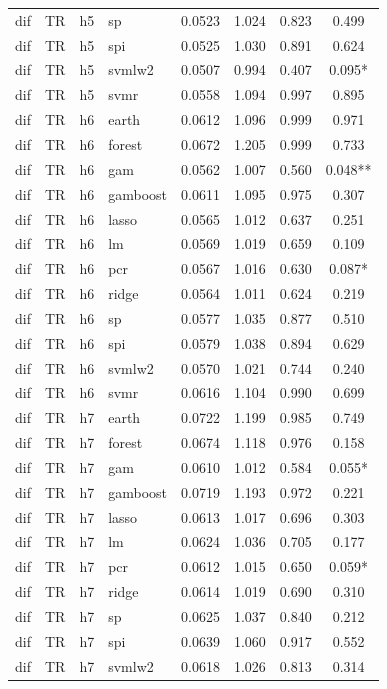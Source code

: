 \begin{ThreePartTable}
\begin{longtable}[t]{llclcccc}
dif & TR & h5 & sp & 0.0523 & 1.024 & 0.823 & 0.499\\
dif & TR & h5 & spi & 0.0525 & 1.030 & 0.891 & 0.624\\
dif & TR & h5 & svmlw2 & 0.0507 & 0.994 & 0.407 & 0.095*\\
dif & TR & h5 & svmr & 0.0558 & 1.094 & 0.997 & 0.895\\
\addlinespace
dif & TR & h6 & earth & 0.0612 & 1.096 & 0.999 & 0.971\\
dif & TR & h6 & forest & 0.0672 & 1.205 & 0.999 & 0.733\\
dif & TR & h6 & gam & 0.0562 & 1.007 & 0.560 & 0.048**\\
dif & TR & h6 & gamboost & 0.0611 & 1.095 & 0.975 & 0.307\\
dif & TR & h6 & lasso & 0.0565 & 1.012 & 0.637 & 0.251\\
dif & TR & h6 & lm & 0.0569 & 1.019 & 0.659 & 0.109\\
dif & TR & h6 & pcr & 0.0567 & 1.016 & 0.630 & 0.087*\\
dif & TR & h6 & ridge & 0.0564 & 1.011 & 0.624 & 0.219\\
dif & TR & h6 & sp & 0.0577 & 1.035 & 0.877 & 0.510\\
dif & TR & h6 & spi & 0.0579 & 1.038 & 0.894 & 0.629\\
dif & TR & h6 & svmlw2 & 0.0570 & 1.021 & 0.744 & 0.240\\
dif & TR & h6 & svmr & 0.0616 & 1.104 & 0.990 & 0.699\\
\addlinespace
dif & TR & h7 & earth & 0.0722 & 1.199 & 0.985 & 0.749\\
dif & TR & h7 & forest & 0.0674 & 1.118 & 0.976 & 0.158\\
dif & TR & h7 & gam & 0.0610 & 1.012 & 0.584 & 0.055*\\
dif & TR & h7 & gamboost & 0.0719 & 1.193 & 0.972 & 0.221\\
dif & TR & h7 & lasso & 0.0613 & 1.017 & 0.696 & 0.303\\
dif & TR & h7 & lm & 0.0624 & 1.036 & 0.705 & 0.177\\
dif & TR & h7 & pcr & 0.0612 & 1.015 & 0.650 & 0.059*\\
dif & TR & h7 & ridge & 0.0614 & 1.019 & 0.690 & 0.310\\
dif & TR & h7 & sp & 0.0625 & 1.037 & 0.840 & 0.212\\
dif & TR & h7 & spi & 0.0639 & 1.060 & 0.917 & 0.552\\
dif & TR & h7 & svmlw2 & 0.0618 & 1.026 & 0.813 & 0.314\\

\end{longtable}
\end{ThreePartTable}
